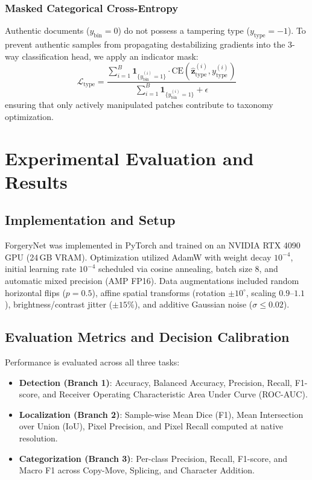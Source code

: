 \documentclass[runningheads]{llncs}
\begin{document}
\subsubsection{Masked Categorical Cross-Entropy}
Authentic documents ($y_{\text{bin}} = 0$) do not possess a tampering type ($y_{\text{type}} = -1$). To prevent authentic samples from propagating destabilizing gradients into the 3-way classification head, we apply an indicator mask:
\begin{equation}
\mathcal{L}_{\text{type}} = \frac{\sum_{i=1}^B \mathbf{1}_{\{y_{\text{bin}}^{(i)} = 1\}} \cdot \text{CE}(\hat{\mathbf{z}}_{\text{type}}^{(i)}, y_{\text{type}}^{(i)})}{\sum_{i=1}^B \mathbf{1}_{\{y_{\text{bin}}^{(i)} = 1\}} + \epsilon}\label{eq_loss_type}
\end{equation}
ensuring that only actively manipulated patches contribute to taxonomy optimization.

\section{Experimental Evaluation and Results}\label{sec5}

\subsection{Implementation and Setup}\label{subsec5_1}
ForgeryNet was implemented in PyTorch and trained on an NVIDIA RTX 4090 GPU (24\,GB VRAM). Optimization utilized AdamW with weight decay $10^{-4}$, initial learning rate $10^{-4}$ scheduled via cosine annealing, batch size $8$, and automatic mixed precision (AMP FP16). Data augmentations included random horizontal flips ($p=0.5$), affine spatial transforms (rotation $\pm 10^\circ$, scaling $0.9\text{--}1.1$), brightness/contrast jitter ($\pm 15\%$), and additive Gaussian noise ($\sigma \le 0.02$).

\subsection{Evaluation Metrics and Decision Calibration}\label{subsec5_2}
Performance is evaluated across all three tasks:
\begin{itemize}
    \item \textbf{Detection (Branch 1)}: Accuracy, Balanced Accuracy, Precision, Recall, F1-score, and Receiver Operating Characteristic Area Under Curve (ROC-AUC).
    \item \textbf{Localization (Branch 2)}: Sample-wise Mean Dice (F1), Mean Intersection over Union (IoU), Pixel Precision, and Pixel Recall computed at native resolution.
    \item \textbf{Categorization (Branch 3)}: Per-class Precision, Recall, F1-score, and Macro F1 across Copy-Move, Splicing, and Character Addition.
\end{itemize}
\end{document}
